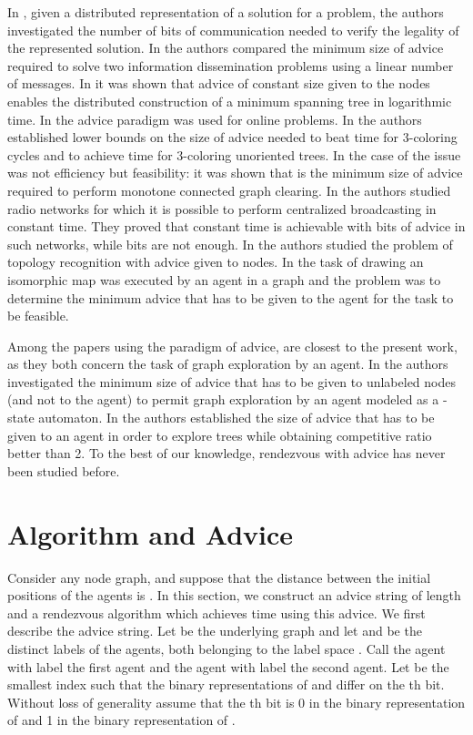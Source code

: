 \documentclass{llncs}
\begin{document}
 In \cite{KKP05}, given a distributed representation of a solution for a problem,
the authors investigated the number of bits of communication needed to verify the legality of the represented solution.
In \cite{FIP1} the authors compared the minimum size of advice required to
solve two information dissemination problems using a linear number of messages. 
In \cite{FKL} it was shown that advice of constant size given to the nodes enables the distributed construction of a minimum
spanning tree in logarithmic time. 
In \cite{EFKR} the advice paradigm was used for online problems.
In \cite{FGIP} the authors established lower bounds on the size of advice 
needed to beat time 
for 3-coloring cycles and to achieve time  for 3-coloring unoriented trees.  
In the case of \cite{SN} the issue was not efficiency but feasibility: it
was shown that  is the minimum size of advice
required to perform monotone connected graph clearing.
In \cite{IKP} the authors studied radio networks for
which it is possible to perform centralized broadcasting in constant time. They proved that constant time is achievable with
 bits of advice in such networks, while
 bits are not enough. In \cite{FPR} the authors studied the problem of topology recognition with advice given to nodes. 
In \cite{DP} the task of drawing an isomorphic map was executed by an agent in a graph and the problem was to determine the minimum advice that has to be given to the agent
for the task to be feasible.

Among the papers using the paradigm of advice, \cite{CFIKP,FIP2} are closest to the present work, as they both concern the task of graph exploration by an agent.
In \cite{CFIKP} the authors investigated the minimum size of advice that has to be given to unlabeled nodes (and not to the agent)
to permit graph exploration by an agent modeled as a -state automaton.
In \cite{FIP2} the authors
established the size of advice that has to be given to an agent in order to explore trees while obtaining 
competitive ratio better than 2.
To the best of our knowledge, rendezvous with advice has never been studied before.



\section{Algorithm and Advice}

Consider any  node graph, and suppose that the distance between the initial positions of the agents is  .
In this section, we construct an advice string of length  and a rendezvous algorithm which achieves time  using this advice.
We first describe the advice string. Let  be the underlying graph and let  and  be the distinct labels of the agents, both belonging to the  label space . Call the agent with label  the first agent and the agent with label  the second agent.
Let  be the smallest index such that the binary representations of  and  differ on the th bit. Without loss of generality assume that the th bit is 0
in the binary representation of   and 1 in the  binary representation of .
\end{document}
